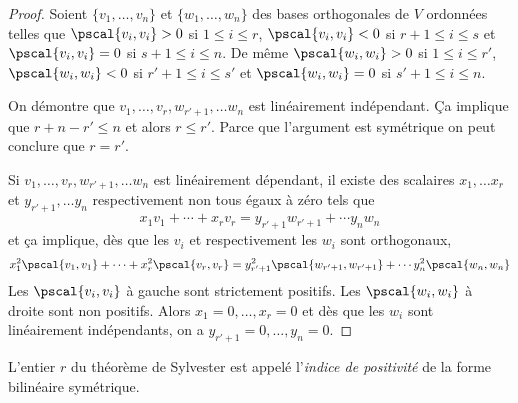 \begin{proof}
  Soient $\{v_1,\dots,v_n\}$
  et $\{w_1,\dots,w_n\}$ des
  bases orthogonales de $V$ ordonnées 
  telles que $\pscal{v_i,v_i} >0 $
  si $1 \leq i \leq r$,
  $\pscal{v_i,v_i} <0 $
  si $r+1 \leq i \leq s$
  et $\pscal{v_i,v_i} =0 $
  si $s+1 \leq i \leq n$.
  De même $\pscal{w_i,w_i} >0 $
  si $1 \leq i \leq r'$,
  $\pscal{w_i,w_i} <0 $
  si $r'+1 \leq i \leq s'$
  et $\pscal{w_i,w_i} =0 $ si $s'+1 \leq i \leq n$.



  On démontre que $v_1,\dots,v_r,w_{r'+1},\dots w_n$
  est linéairement indépendant. Ça implique que $r + n-r' \leq n$
  et alors $r \leq r'$.
  Parce que l'argument est symétrique on peut conclure que $r = r'$.

  Si $v_1,\dots,v_r,w_{r'+1},\dots w_n$ est linéairement dépendant, il existe des scalaires $x_1,\dots x_r$ et $y_{r'+1},\dots y_n$ respectivement  non tous égaux à zéro tels que 
  \begin{displaymath}
    x_1 v_1 + \cdots + x_r v_r = y_{r'+1} w_{r'+1} + \cdots y_n w_n 
  \end{displaymath}
et ça implique, dès que les $v_i$ et respectivement les $w_i$  sont orthogonaux, 
\begin{displaymath}
   x_1^2\pscal{v_1,v_1} + \cdots + x_r^2 \pscal{v_r,v_r} = y_{r'+1}^2 \pscal{w_{r'+1},w_{r'+1}} + \cdots y_n^2 \pscal{w_n,w_n} 
\end{displaymath}
Les $\pscal{v_i,v_i}$ à gauche sont strictement positifs. Les $\pscal{w_i,w_i} $ à droite sont non positifs. Alors $x_1=0,\dots,x_r = 0$ et dès que les $w_i$ sont linéairement indépendants, on a $y_{r'+1}=0,\dots,y_n=0$. 
\end{proof}


\begin{definition}
  \label{def:12}
  L'entier $r$ du théorème de Sylvester est appelé l'\emph{indice de positivité} de la forme bilinéaire symétrique. 
\end{definition}



